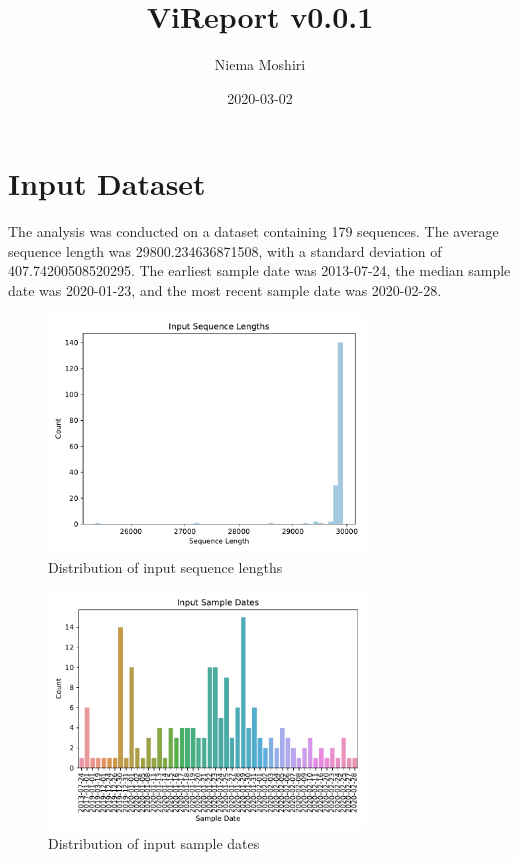 \documentclass{article}
\title{\vspace{-2.0cm}ViReport v0.0.1}
\author{Niema Moshiri}
\date{2020-03-02}
\begin{document}
\maketitle

\section{Input Dataset}
The analysis was conducted on a dataset containing 179 sequences.
The average sequence length was 29800.234636871508,
with a standard deviation of 407.74200508520295.
The earliest sample date was 2013-07-24,
the median sample date was 2020-01-23,
and the most recent sample date was 2020-02-28.


\begin{figure}[h]
\centering
\includegraphics[width=0.75\textwidth]{./figs/input_sequence_lengths.pdf}
\caption{Distribution of input sequence lengths}
\end{figure}



\begin{figure}[h]
\centering
\includegraphics[width=0.75\textwidth]{./figs/input_sample_dates.pdf}
\caption{Distribution of input sample dates}
\end{figure}
\end{document}
